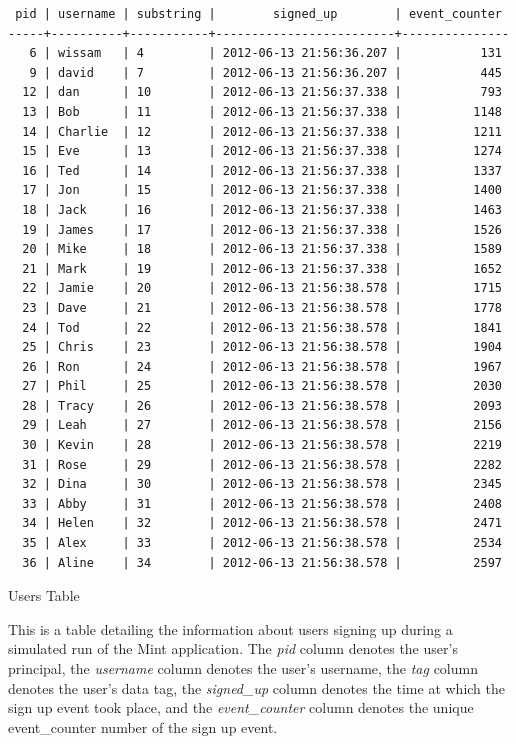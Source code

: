 \begin{table}
\begin{verbatim}
 pid | username | substring |        signed_up        | event_counter 
-----+----------+-----------+-------------------------+---------------
   6 | wissam   | 4         | 2012-06-13 21:56:36.207 |           131
   9 | david    | 7         | 2012-06-13 21:56:36.207 |           445
  12 | dan      | 10        | 2012-06-13 21:56:37.338 |           793
  13 | Bob      | 11        | 2012-06-13 21:56:37.338 |          1148
  14 | Charlie  | 12        | 2012-06-13 21:56:37.338 |          1211
  15 | Eve      | 13        | 2012-06-13 21:56:37.338 |          1274
  16 | Ted      | 14        | 2012-06-13 21:56:37.338 |          1337
  17 | Jon      | 15        | 2012-06-13 21:56:37.338 |          1400
  18 | Jack     | 16        | 2012-06-13 21:56:37.338 |          1463
  19 | James    | 17        | 2012-06-13 21:56:37.338 |          1526
  20 | Mike     | 18        | 2012-06-13 21:56:37.338 |          1589
  21 | Mark     | 19        | 2012-06-13 21:56:37.338 |          1652
  22 | Jamie    | 20        | 2012-06-13 21:56:38.578 |          1715
  23 | Dave     | 21        | 2012-06-13 21:56:38.578 |          1778
  24 | Tod      | 22        | 2012-06-13 21:56:38.578 |          1841
  25 | Chris    | 23        | 2012-06-13 21:56:38.578 |          1904
  26 | Ron      | 24        | 2012-06-13 21:56:38.578 |          1967
  27 | Phil     | 25        | 2012-06-13 21:56:38.578 |          2030
  28 | Tracy    | 26        | 2012-06-13 21:56:38.578 |          2093
  29 | Leah     | 27        | 2012-06-13 21:56:38.578 |          2156
  30 | Kevin    | 28        | 2012-06-13 21:56:38.578 |          2219
  31 | Rose     | 29        | 2012-06-13 21:56:38.578 |          2282
  32 | Dina     | 30        | 2012-06-13 21:56:38.578 |          2345
  33 | Abby     | 31        | 2012-06-13 21:56:38.578 |          2408
  34 | Helen    | 32        | 2012-06-13 21:56:38.578 |          2471
  35 | Alex     | 33        | 2012-06-13 21:56:38.578 |          2534
  36 | Aline    | 34        | 2012-06-13 21:56:38.578 |          2597
\end{verbatim}
\caption*{Users Table}
\caption{This is a table detailing the information about users signing up during a simulated run of the Mint application. The \emph{pid} column denotes the user's principal, the \emph{username} column denotes the user's username, the \emph{tag} column denotes the user's data tag, the \emph{signed\_up} column denotes the time at which the sign up event took place, and the \emph{event\_counter} column denotes the unique event\_counter number of the sign up event.}
\label{table:users-info}
\end{table}

